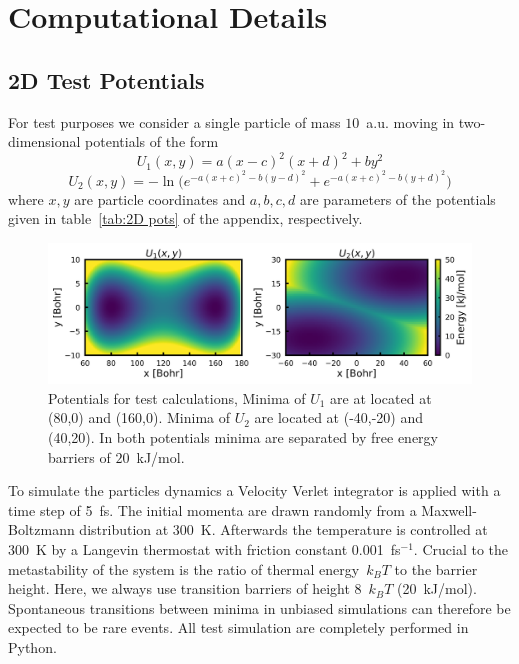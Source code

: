 \chapter{Computational Details}
\label{cha:comp}

\section{2D Test Potentials}
\label{sec:comp 2D}
For test purposes we consider a single particle of mass $10$~a.u. moving in two-dimensional potentials of the form
\begin{equation}
  U_1(x,y) = a(x-c)^2(x+d)^2 + by^2 \label{eq:U1}
\end{equation}
\begin{equation}
  U_2(x,y) = -\ln\bigl( e^{-a(x+c)^2 - b(y-d)^2} + e^{-a(x+c)^2 - b(y+d)^2} \bigr) \label{eq:U2}
\end{equation}
where $x,y$ are particle coordinates and $a,b,c,d$ are parameters of the potentials given in table~\ref{tab:2D pots} of the appendix, respectively.
\begin{figure}[H]
    \centering
    \includegraphics[width=1.0\textwidth]{bilder/U}
    \caption{Potentials for test calculations, Minima of $U_1$ are at located at (80,0) and (160,0). Minima of $U_2$ are located at (-40,-20) and (40,20). In both potentials minima are separated by free energy barriers of $20$~kJ/mol.}
\label{fig:potentials}%
\end{figure}
To simulate the particles dynamics a Velocity Verlet\autocite{swope1982computer} integrator is applied with a time step of 5~fs.
The initial momenta are drawn randomly from a Maxwell-Boltzmann distribution at 300~K.
Afterwards the temperature is controlled at 300~K by a Langevin thermostat\autocite{kroger2005models} with friction constant 0.001~fs$^{-1}$.
Crucial to the metastability of the system is the ratio of thermal energy~$k_B T$ to the barrier height.
Here, we always use transition barriers of height 8~$k_B T$ (20~kJ/mol).
Spontaneous transitions between minima in unbiased simulations can therefore be expected to be rare events.
All test simulation are completely performed in Python.

